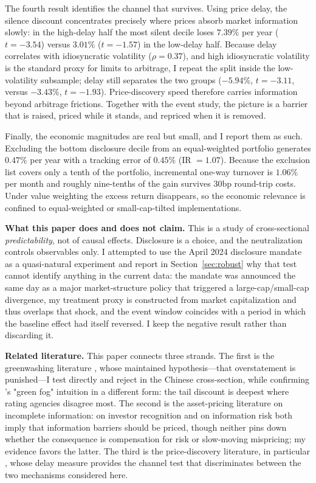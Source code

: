 \documentclass[12pt]{article}
\begin{document}
The fourth result identifies the channel that survives. Using
\citet{hou2005} price delay, the silence discount concentrates precisely where
prices absorb market information slowly: in the high-delay half the most silent
decile loses $7.39\%$ per year ($t=-3.54$) versus $3.01\%$ ($t=-1.57$) in the
low-delay half. Because delay correlates with idiosyncratic volatility
($\rho=0.37$), and high idiosyncratic volatility is the standard proxy for
limits to arbitrage, I repeat the split inside the low-volatility subsample;
delay still separates the two groups ($-5.94\%$, $t=-3.11$, versus $-3.43\%$,
$t=-1.93$). Price-discovery speed therefore carries information beyond
arbitrage frictions. Together with the event study, the picture is a barrier
that is raised, priced while it stands, and repriced when it is removed.

Finally, the economic magnitudes are real but small, and I report them as such.
Excluding the bottom disclosure decile from an equal-weighted portfolio
generates $0.47\%$ per year with a tracking error of $0.45\%$ (IR $=1.07$).
Because the exclusion list covers only a tenth of the portfolio, incremental
one-way turnover is $1.06\%$ per month and roughly nine-tenths of the gain
survives 30bp round-trip costs. Under value weighting the excess return
disappears, so the economic relevance is confined to equal-weighted or
small-cap-tilted implementations.

\medskip
\noindent\textbf{What this paper does and does not claim.} This is a study of
cross-sectional \emph{predictability}, not of causal effects. Disclosure is a
choice, and the neutralization controls observables only. I attempted to use
the April 2024 disclosure mandate as a quasi-natural experiment and report in
Section~\ref{sec:robust} why that test cannot identify anything in the current
data: the mandate was announced the same day as a major market-structure policy
that triggered a large-cap/small-cap divergence, my treatment proxy is
constructed from market capitalization and thus overlaps that shock, and the
event window coincides with a period in which the baseline effect had itself
reversed. I keep the negative result rather than discarding it.

\medskip
\noindent\textbf{Related literature.} This paper connects three strands. The
first is the greenwashing literature \citep{yu2020,hu2023}, whose maintained
hypothesis---that overstatement is punished---I test directly and reject in the
Chinese cross-section, while confirming \citet{hu2023}'s "green fog"
intuition in a different form: the tail discount is deepest where rating
agencies disagree most. The second is the asset-pricing literature on
incomplete information: \citet{merton1987} on investor recognition and
\citet{easley2004} on information risk both imply that information barriers
should be priced, though neither pins down whether the consequence is
compensation for risk or slow-moving mispricing; my evidence favors the
latter. The third is the price-discovery literature, in particular
\citet{hou2005}, whose delay measure provides the channel test that
discriminates between the two mechanisms considered here.
\end{document}
